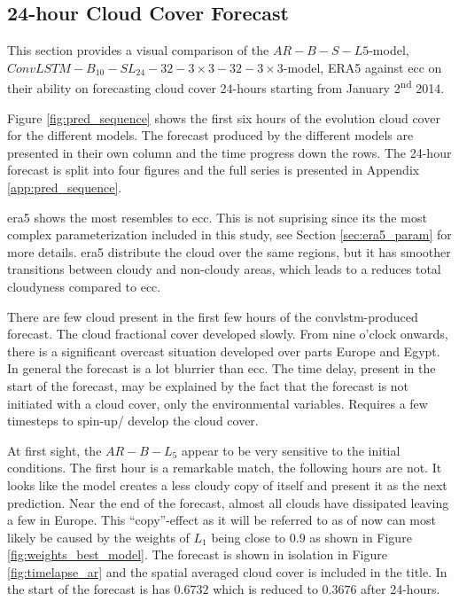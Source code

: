 \subsection{24-hour Cloud Cover Forecast}
This section provides a visual comparison of the $AR-B-S-L5$-model, $ConvLSTM-B_{10}-SL_{24}-32-3\times3-32-3 \times3$-model, ERA5 against \acrshort{ecc} on their ability on forecasting cloud cover 24-hours starting from January 2\textsuperscript{nd} 2014.

Figure \ref{fig:pred_sequence} shows the first six hours of the evolution cloud cover for the different models. The forecast produced by the different models are presented in their own column and the time progress down the rows. The 24-hour forecast is split into four figures and the full series is presented in Appendix \ref{app:pred_sequence}. 

\acrshort{era5} shows the most resembles to \acrshort{ecc}. This is not suprising since its the most complex parameterization included in this study, see Section \ref{sec:era5_param} for more details. \acrshort{era5} distribute the cloud over the same regions, but it has smoother transitions between cloudy and non-cloudy areas, which leads to a reduces total cloudyness compared to \acrshort{ecc}.

There are few cloud present in the first few hours of the \acrshort{convlstm}-produced forecast. The cloud fractional cover developed slowly. From nine o'clock onwards, there is a significant overcast situation developed over parts Europe and Egypt. In general the forecast is a lot blurrier than \acrshort{ecc}. The time delay, present in the start of the forecast, may be explained by the fact that the forecast is not initiated with a cloud cover, only the environmental variables. Requires a few timesteps to spin-up/ develop the cloud cover.

At first sight, the $AR-B-L_5$ appear to be very sensitive to the initial conditions. The first hour is a remarkable match, the following hours are not. It looks like the model creates a less cloudy copy of itself and present it as the next prediction. Near the end of the forecast, almost all clouds have dissipated leaving a few in Europe. This ``copy''-effect as it will be referred to as of now can most likely be caused by the weights of $L_1$ being close to $0.9$ as shown in Figure \ref{fig:weights_best_model}. The forecast is shown in isolation in Figure \ref{fig:timelapse_ar} and the spatial averaged cloud cover is included in the title. In the start of the forecast is has $0.6732$ which is reduced to $0.3676$ after 24-hours.

